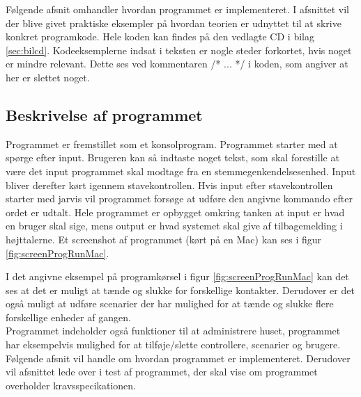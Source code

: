 Følgende afsnit omhandler hvordan programmet er implementeret. I afsnittet vil der blive givet praktiske eksempler på hvordan teorien er udnyttet til at skrive konkret programkode. Hele koden kan findes på den vedlagte CD i bilag \ref{sec:bilcd}. Kodeeksemplerne indsat i teksten er nogle steder forkortet, hvis noget er mindre relevant. Dette ses ved kommentaren /* ... */ i koden, som angiver at her er slettet noget.

\subsection{Beskrivelse af programmet}\label{sec:impbeskr}
Programmet er fremstillet som et konsolprogram. Programmet starter med at spørge efter input. Brugeren kan så indtaste noget tekst, som skal forestille at være det input programmet skal modtage fra en stemmegenkendelsesenhed. Input bliver derefter kørt igennem stavekontrollen. Hvis input efter stavekontrollen starter med jarvis vil programmet forsøge at udføre den angivne kommando efter ordet er udtalt. Hele programmet er opbygget omkring tanken at input er hvad en bruger skal sige, mens output er hvad systemet skal give af tilbagemelding i højttalerne. Et screenshot af programmet (kørt på en Mac) kan ses i figur \ref{fig:screenProgRunMac}.


I det angivne eksempel på programkørsel i figur \ref{fig:screenProgRunMac} kan det ses at det er muligt at tænde og slukke for forskellige kontakter. Derudover er det også muligt at udføre scenarier der har mulighed for at tænde og slukke flere forskellige enheder af gangen.\\

Programmet indeholder også funktioner til at administrere huset, programmet har eksempelvis mulighed for at tilføje/slette controllere, scenarier og brugere.\\

Følgende afsnit vil handle om hvordan programmet er implementeret. Derudover vil afsnittet lede over i test af programmet, der skal vise om programmet overholder kravsspecikationen.


